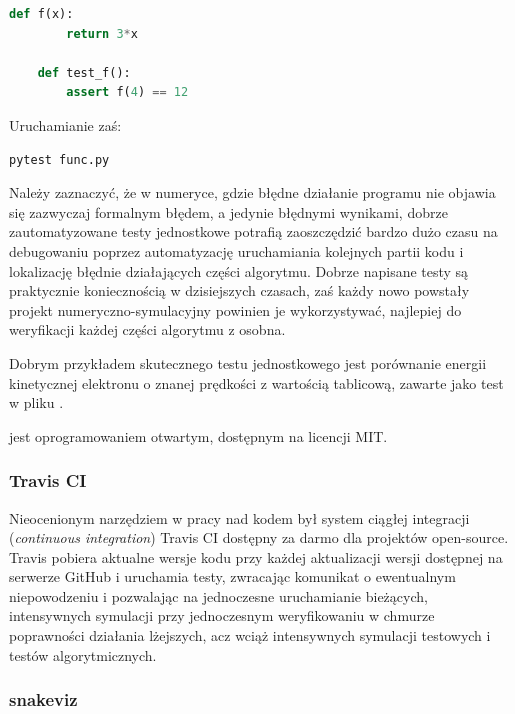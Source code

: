     \begin{lstlisting}[language=Python, caption=Podstawowy przykład testu w pliku \code{func.py}]
    def f(x):
        return 3*x

    def test_f():
        assert f(4) == 12
    \end{lstlisting}

    Uruchamianie zaś:

    \begin{lstlisting}[language=Bash]
        pytest func.py
    \end{lstlisting}

    Należy zaznaczyć, że w numeryce, gdzie błędne działanie programu nie
    objawia się zazwyczaj formalnym błędem, a jedynie błędnymi
    wynikami, dobrze zautomatyzowane testy jednostkowe potrafią zaoszczędzić
    bardzo dużo czasu na debugowaniu poprzez automatyzację uruchamiania
    kolejnych partii kodu i lokalizację błędnie działających części algorytmu.
    Dobrze napisane testy są praktycznie koniecznością w dzisiejszych czasach,
    zaś każdy nowo powstały projekt numeryczno-symulacyjny powinien je
    wykorzystywać, najlepiej do weryfikacji każdej części algorytmu z osobna.

    Dobrym przykładem skutecznego testu jednostkowego jest porównanie energii kinetycznej
    elektronu o znanej prędkości z wartością tablicową, zawarte jako test w pliku
    .

     jest oprogramowaniem otwartym, dostępnym na licencji MIT.

    \subsubsection{Travis CI}
    Nieocenionym narzędziem w pracy nad kodem był system ciągłej integracji
    (\emph{continuous integration}) Travis CI \cite{travisci}
    dostępny za
    darmo dla projektów open-source. Travis pobiera aktualne wersje kodu przy
    każdej aktualizacji wersji dostępnej na serwerze GitHub i uruchamia testy,
    zwracając komunikat o ewentualnym niepowodzeniu i pozwalając na jednoczesne
    uruchamianie bieżących, intensywnych symulacji przy jednoczesnym
    weryfikowaniu w chmurze poprawności działania lżejszych, acz wciąż intensywnych
    symulacji testowych i testów algorytmicznych.

    \subsubsection{snakeviz}

